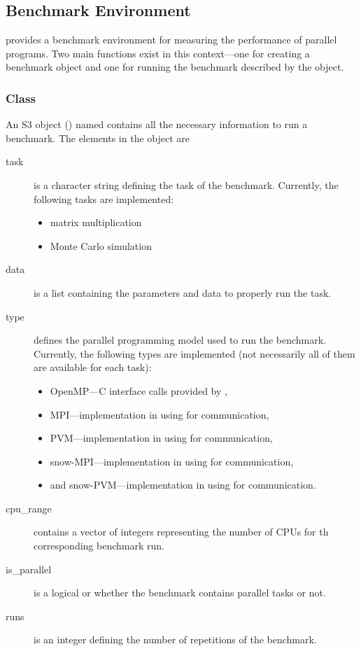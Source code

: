 \subsection{Benchmark Environment}

 provides a benchmark environment for measuring the
performance of parallel programs. Two main functions exist in this
context---one for creating a benchmark object and one for running the
benchmark described by the object.

\subsubsection{Class }

An S3 object (\cite{chambers91sms}) named  contains all
the necessary information to run a benchmark. The elements in the
object are

\begin{description}
\item[task] is a character string defining the task of the
  benchmark. Currently, the 
  following tasks are implemented:
  \begin{itemize}
  \item matrix multiplication
  \item Monte Carlo simulation
  \end{itemize}
\item[data] is a list containing the parameters and data to properly
  run the task.
\item[type]defines the parallel programming model used to run the
  benchmark. Currently, the following types are implemented (not
  necessarily all of them are available for each task):
  \begin{itemize}
  \item OpenMP---C interface calls provided by ,
  \item MPI---implementation in  using  for
    communication,
  \item PVM---implementation in  using  for
    communication,
  \item snow-MPI---implementation in  using  for
    communication,
  \item and snow-PVM---implementation in  using  for
    communication.
  \end{itemize}
\item[cpu\_range] contains a vector of integers representing the number
  of CPUs for th corresponding benchmark run.
\item[is\_parallel] is a logical  or  whether
  the benchmark
  contains parallel tasks or not.
\item[runs] is an integer defining the number of repetitions of the
  benchmark.
\end{description}

